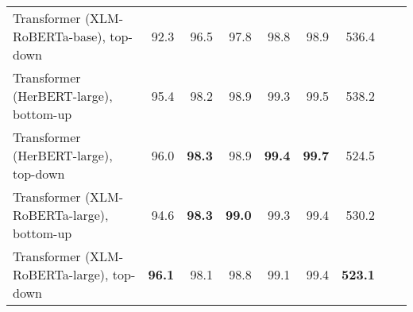 \begin{table}[ht!]
{\begin{tabular}{lrrrrrrrr}
  Transformer (XLM-RoBERTa-base), top-down & 92.3 & 96.5 & 97.8 & 98.8 & 98.9 & 536.4 \\ 
  Transformer (HerBERT-large), bottom-up & 95.4 & 98.2 & 98.9 & 99.3 & 99.5 & 538.2 \\ 
  Transformer (HerBERT-large), top-down & 96.0 & \textbf{98.3} & 98.9 & \textbf{99.4} & \textbf{99.7} & 524.5 \\ 
  Transformer (XLM-RoBERTa-large), bottom-up & 94.6 & \textbf{98.3} & \textbf{99.0} & 99.3 & 99.4 & 530.2 \\ 
  Transformer (XLM-RoBERTa-large), top-down & \textbf{96.1} & 98.1 & 98.8 & 99.1 & 99.4 & \textbf{523.1} \\ 
   \hline
\end{tabular}
}
\end{table}




